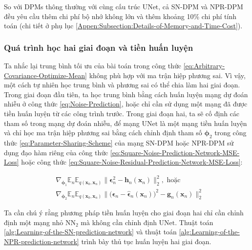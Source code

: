 \documentclass[14pt, a4paper]{article}
\numberwithin{equation}{section}
\numberwithin{figure}{section}
\numberwithin{dl}{section}
\numberwithin{md}{section}
\numberwithin{bd}{section}
\numberwithin{dn}{section}
\numberwithin{hq}{section}
\begin{document}
    So với DPMs thông thường với cùng cấu trúc $\mathrm{UNet}$, cả SN-DPM và NPR-DPM đều yêu cầu thêm chi phí bộ nhớ không lớn và thêm khoảng 10\% chi phí tính toán (chi tiết ở phụ lục \ref{Appen:Subsection:Details-of-Memory-and-Time-Cost}).

    \subsubsection{Quá trình học hai giai đoạn và tiền huấn luyện} \label{Subsection:Two-Stage-Learning-and-Pretraining}

    Ta nhắc lại trung bình tối ưu của bài toán trong công thức \ref{eq:Arbitrary-Covariance-Optimize-Mean} không phù hợp với ma trận hiệp phương sai.
    Vì vậy, một cách tự nhiên học trung bình và phương sai có thể chia làm hai giai đoạn.
    Trong giai đoạn đầu tiên, ta học trung bình bằng cách huấn luyện mạng dự đoán nhiễu ở công thức \ref{eq:Noise-Prediction},
    hoặc chỉ cần sử dụng một mạng đã được tiền huấn luyện từ các công trình trước.
    Trong giai đoạn hai, ta sẽ cố định các tham số trong mạng dự đoán nhiễu, để mạng $\mathrm{UNet}$ là một mạng tiền huấn luyện và chỉ học ma trận hiệp phương sai bằng cách chỉnh định tham số $\boldsymbol{\phi}_2$ trong công thức \ref{eq:Parameter-Sharing-Scheme} của mạng SN-DPM hoặc NPR-DPM sử dụng đạo hàm riêng của công thức \ref{eq:Square-Noise-Prediction-Network-MSE-Loss} hoặc công thức \ref{eq:Square-Noise-Residual-Prediction-Network-MSE-Loss}:

    \begin{equation}
        \begin{aligned}
        &\nabla_{\boldsymbol{\phi}_1} \mathbb{E}_n \mathbb{E}_{q(\boldsymbol{x}_0, \boldsymbol{x}_n)} \lVert \boldsymbol{\epsilon}_n^2 - \boldsymbol{h}_n (\boldsymbol{x}_n) \rVert_2^2, \text{ hoặc} \\
        &\nabla_{\boldsymbol{\phi}_2} \mathbb{E}_n \mathbb{E}_{q(\boldsymbol{x}_0, \boldsymbol{x}_n)} \lVert \big( \boldsymbol{\epsilon}_n - \hat{\boldsymbol{\epsilon}}_n (\boldsymbol{x}_n) \big)^2 - \boldsymbol{g}_n (\boldsymbol{x}_n) \rVert_2^2
        \end{aligned}
    \end{equation}

    Ta cần chú ý rằng phương pháp tiền huấn luyện cho giai đoạn hai chỉ cần chỉnh định một mạng nhỏ $\mathrm{NN}_2$ mà không cần chỉnh định $\mathrm{UNet}$.
    Thuật toán \ref{alg:Learning-of-the-SN-prediction-network} và thuật toán \ref{alg:Learning-of-the-NPR-prediction-network} trình bày thủ tục huấn luyện hai giai đoạn.
    
\end{document}

